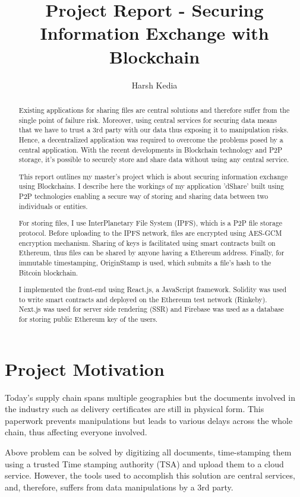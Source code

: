 \documentclass[]{report}
\title{Project Report - Securing Information Exchange with Blockchain}
\author{Harsh Kedia}
\begin{document}
	\maketitle

	\begin{abstract}
		Existing applications for sharing files are central solutions and therefore suffer from the single point of failure risk. Moreover, using central services for securing data means that we have to trust a 3rd party with our data thus exposing it to manipulation risks. Hence, a decentralized application was required to overcome the problems posed by a central application. With the recent developments in Blockchain technology and P2P storage, it's possible to securely store and share data without using any central service.
		
		This report outlines my master's project which is about securing information exchange using Blockchains. I describe here the workings of my application 'dShare' built using P2P technologies enabling a secure way of storing and sharing data between two individuals or entities.
		
		For storing files, I use InterPlanetary File System (IPFS), which is a P2P file storage protocol. Before uploading to the IPFS network, files are encrypted using AES-GCM encryption mechanism. Sharing of keys is facilitated using smart contracts built on Ethereum, thus files can be shared by anyone having a Ethereum address. Finally, for immutable timestamping, OriginStamp is used, which submits a file's hash to the Bitcoin blockchain.
				
		I implemented the front-end using React.js, a JavaScript framework. Solidity was used to write smart contracts and deployed on the Ethereum test network (Rinkeby). Next.js was used for server side rendering (SSR) and Firebase was used as a database for storing public Ethereum key of the users.
	\end{abstract}

	\section*{Project Motivation}
		Today's supply chain spans multiple geographies but the documents involved in the industry such as delivery certificates are still in physical form. This paperwork prevents manipulations but leads to various delays across the whole chain, thus affecting everyone involved.
		
		Above problem can be solved by digitizing all documents, time-stamping them using a trusted Time stamping authority (TSA) and upload them to a cloud service. However, the tools used to accomplish this solution are central services, and, therefore, suffers from data manipulations by a 3rd party.
		
\end{document}
